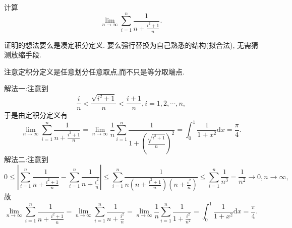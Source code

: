 \documentclass[../../main.tex]{subfiles}%
\begin{document}
\begin{example}
计算
\[
\lim_{n\rightarrow\infty}\sum\limits_{i = 1}^{n}\frac{1}{n+\frac{i^{2}+1}{n}}.
\]
\end{example}
\begin{note}
证明的想法要么是凑定积分定义. 要么强行替换为自己熟悉的结构(拟合法), 无需猜测放缩手段.
\end{note}
\begin{remark}
注意定积分定义是任意划分任意取点,而不只是等分取端点.
\end{remark}
\begin{solution}

{\color{blue}解法一:}注意到
\[
\frac{i}{n}<\frac{\sqrt{i^{2}+1}}{n}<\frac{i + 1}{n},i = 1,2,\cdots,n,
\]
于是由定积分定义有
\[
\lim_{n\rightarrow\infty}\sum\limits_{i = 1}^{n}\frac{1}{n+\frac{i^{2}+1}{n}}=\lim_{n\rightarrow\infty}\frac{1}{n}\sum\limits_{i = 1}^{n}\frac{1}{1+\left(\frac{\sqrt{i^{2}+1}}{n}\right)^{2}}=\int_{0}^{1}\frac{1}{1 + x^{2}}\mathrm{d}x=\frac{\pi}{4}.
\]
{\color{blue}解法二:}注意到
\[
0\leqslant \left|\sum\limits_{i = 1}^{n}\frac{1}{n+\frac{i^{2}+1}{n}}-\sum\limits_{i = 1}^{n}\frac{1}{n+\frac{i^{2}}{n}}\right|\leqslant\sum\limits_{i = 1}^{n}\frac{1}{n\left(n+\frac{i^{2}+1}{n}\right)\left(n+\frac{i^{2}}{n}\right)}\leqslant\sum\limits_{i = 1}^{n}\frac{1}{n^{3}}=\frac{1}{n^{2}}\rightarrow0,n\rightarrow\infty,
\]
故
\[
\lim_{n\rightarrow\infty}\sum\limits_{i = 1}^{n}\frac{1}{n+\frac{i^{2}+1}{n}}=\lim_{n\rightarrow\infty}\sum\limits_{i = 1}^{n}\frac{1}{n+\frac{i^{2}}{n}}=\lim_{n\rightarrow\infty}\frac{1}{n}\sum\limits_{i = 1}^{n}\frac{1}{1+\frac{i^{2}}{n^{2}}}=\int_{0}^{1}\frac{1}{1 + x^{2}}\mathrm{d}x=\frac{\pi}{4}.
\]

\end{solution}
\end{document}
